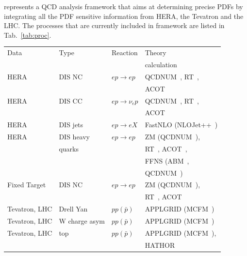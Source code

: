 \fitter represents a QCD analysis framework that aims at 
determining precise PDFs by integrating all the PDF sensitive information
from HERA, the Tevatron and the LHC.
%
The processes that are currently included in \fitter framework are listed in Tab.~\ref{tab:proc}.
%
\begin{table}
\small
\scriptsize

\begin{tabular}{|l|l|l|l|}
\hline
Data &Type &  Reaction & Theory      \\
        &     &     & calculation \\
\hline

HERA &DIS NC   &$ep\to ep$      & QCDNUM~\cite{qcdnum}, RT~\cite{Thorne:1997ga,Thorne:2006qt,Martin:epC63,Thorne:6180}, \\
     &         &                & ACOT~\cite{CWZ} \\
HERA &DIS CC   &$ep\to \nu_e p$ & QCDNUM~\cite{qcdnum}, RT~\cite{Thorne:1997ga,Thorne:2006qt,Martin:epC63,Thorne:6180}, \\
     &         &                & ACOT~\cite{CWZ} \\
HERA &DIS jets &$ep\to eX$      & FastNLO (NLOJet++~\cite{Nagy:1998bb,Nagy:2001fj})\\
HERA &DIS heavy                 & $ep\to ep $& ZM (QCDNUM~\cite{qcdnum}), \\
     & quarks  &                & RT~\cite{Thorne:1997ga,Thorne:2006qt,Martin:epC63,Thorne:6180}, ACOT~\cite{CWZ}, \\
     &         &                & FFNS (ABM~\cite{Alekhin:runm,openqcdrad:page}, \\
     &         &                & QCDNUM~\cite{qcdnum}) \\
\hline
Fixed Target   &DIS NC          &$ep\to ep$ & ZM (QCDNUM~\cite{qcdnum}), \\
     &         &                & RT~\cite{Thorne:1997ga,Thorne:2006qt,Martin:epC63,Thorne:6180}, ACOT~\cite{CWZ} \\
\hline
Tevatron, LHC &Drell Yan &$pp(\bar p)$ & APPLGRID (MCFM~\cite{Campbell:1999ah,Campbell:2000je,Campbell:2010ff}) \\
Tevatron, LHC &W charge asym &$pp(\bar p)$ & APPLGRID (MCFM~\cite{Campbell:1999ah,Campbell:2000je,Campbell:2010ff}) \\
Tevatron, LHC &top &$pp(\bar p)$  & APPLGRID (MCFM~\cite{Campbell:1999ah,Campbell:2000je,Campbell:2010ff}),  \\
              &    &              & HATHOR~\cite{Aliev:2010zk} \\

\end{tabular}
\end{table}
